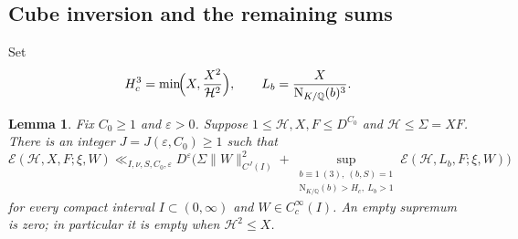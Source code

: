 \documentclass[11pt,a4paper]{article}
\numberwithin{equation}{section}
\numberwithin{figure}{section}
\newtheorem{lemma}[theorem]{Lemma}
\theoremstyle{definition}
\theoremstyle{remark}
\newcommand{\Q}{\mathbb Q}
\newcommand{\NK}{\mathrm N_{K/\Q}}
\newcommand{\E}{\mathcal E}
\begin{document}
\subsection{Cube inversion and the remaining sums}
Set
\begin{equation}\label{eq:cube-cutoff}
 H_c^3=\min\!\Bigl(X,\frac{X^2}{\mathcal H^2}\Bigr),
 \qquad L_b=\frac{X}{\NK(b)^3}.
\end{equation}

\begin{lemma}\label{lem:cube-reduction}
Fix $C_0\ge1$ and $\varepsilon>0$. Suppose
$1\le\mathcal H,X,F\le D^{C_0}$ and $\mathcal H\le\Sigma=XF$.
There is an integer $J=J(\varepsilon,C_0)\ge1$ such that
\begin{equation}\label{eq:cube-reduction}
 \E(\mathcal H,X,F;\xi,W)
 \ll_{I,\nu,S,C_0,\varepsilon}D^\varepsilon
 \biggl(\Sigma\|W\|_{C^J(I)}^2+
 \sup_{\substack{b\equiv1\ (3),\ (b,S)=1\\
                  \NK(b)>H_c,\ L_b>1}}
       \E(\mathcal H,L_b,F;\xi,W)\biggr)
\end{equation}
for every compact interval $I\subset(0,\infty)$ and
$W\in C_c^\infty(I)$. An empty supremum is zero; in particular it
is empty when $\mathcal H^2\le X$.
\end{lemma}
\end{document}

